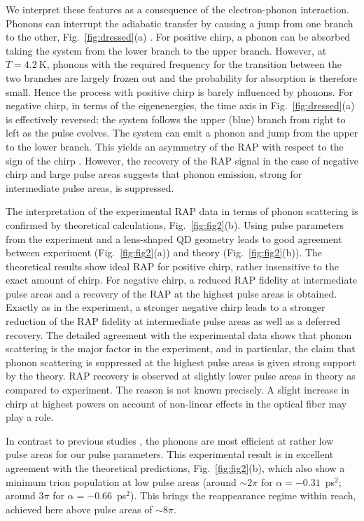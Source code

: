 \documentclass[aps,prl,reprint,superscriptaddress]{revtex4-1}
\begin{document}
We interpret these features as a consequence of the electron-phonon interaction. Phonons can interrupt the adiabatic transfer by causing a jump from one branch to the other, Fig.~\ref{fig:dressed}(a) \cite{Luker2012}. For positive chirp, a phonon can be absorbed taking the system from the lower branch to the upper branch. However, at $T=\SI{4.2}{\kelvin}$, phonons with the required frequency for the transition between the two branches are largely frozen out and the probability for absorption is therefore small. Hence the process with positive chirp is barely influenced by phonons. For negative chirp, in terms of the eigenenergies, the time axis in Fig.\ \ref{fig:dressed}(a) is effectively reversed: the system follows the upper (blue) branch from right to left as the pulse evolves. The system can emit a phonon and jump from the upper to the lower branch. This yields an asymmetry of the RAP with respect to the sign of the chirp \cite{Luker2012,Mathew2014,Glassl2013}. However, the recovery of the RAP signal in the case of negative chirp and large pulse areas suggests that phonon emission, strong for intermediate pulse areas, is suppressed.


The interpretation of the experimental RAP data in terms of phonon scattering is confirmed by theoretical calculations, Fig.\ \ref{fig:fig2}(b). Using pulse parameters from the experiment and a lens-shaped QD geometry leads to good agreement between experiment (Fig.\ \ref{fig:fig2}(a)) and theory (Fig.\ \ref{fig:fig2}(b)). The theoretical results show ideal RAP for positive chirp, rather insensitive to the exact amount of chirp. For negative chirp, a reduced RAP fidelity at intermediate pulse areas and a recovery of the RAP at the highest pulse areas is obtained. Exactly as in the experiment, a stronger negative chirp leads to a stronger reduction of the RAP fidelity at intermediate pulse areas as well as a deferred recovery.
 The detailed agreement with the experimental data shows that phonon scattering is the major factor in the experiment, and in particular, the claim that phonon scattering is suppressed at the highest pulse areas is given strong support by the theory. 
RAP recovery is observed at slightly lower pulse areas in theory as compared to experiment. The reason is not known precisely. A slight increase in chirp at highest powers on account of non-linear effects in the optical fiber may play a role.

In contrast to previous studies \cite{Simon2011,Wu2011,Luker2012,Glassl2013}, the phonons are most efficient at rather low pulse areas for our pulse parameters. This experimental result is in excellent agreement with the theoretical predictions, Fig.~\ref{fig:fig2}(b), which also show a minimum trion population at low pulse areas (around $\sim 2\pi$ for $\alpha=-0.31$~ps$^2$; around $3\pi$ for $\alpha=-0.66$~ps$^2$). This brings the reappearance regime within reach, achieved here above pulse areas of $\sim 8\pi$.   
\end{document}
